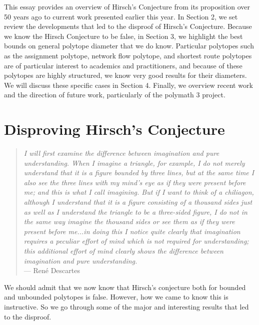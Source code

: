 \documentclass[11pt,a4paper]{article}
\theoremstyle{definition}
\begin{document}
This essay provides an overview of Hirsch's Conjecture from its proposition over 50 years ago to current work presented earlier this year. In Section 2, we set review the developments that led to the disproof of Hirsch's Conjecture. Because we know the Hirsch Conjecture to be false, in Section 3, we highlight the best bounds on general polytope diameter that we do know. Particular polytopes such as the assignment polytope, network flow polytope, and shortest route polytopes are of particular interest to academics and practitioners, and because of these polytopes are highly structured, we know very good results for their diameters. We will discuss these specific cases in Section 4. Finally, we overview recent work and the direction of future work, particularly of the polymath 3 project.

\section{Disproving Hirsch's Conjecture}
\begin{quotation}
\emph{I will first examine the difference between imagination and pure understanding. When I imagine a triangle, for example, I do not merely understand that it is a figure bounded by three lines, but at the same time I also see the three lines with my mind's eye as if they were present before me; and this is what I call imagining. But if I want to think of a chiliagon, although I understand that it is a figure consisting of a thousand sides just as well as I understand the triangle to be a three-sided figure, I do not in the same way imagine the thousand sides or see them as if they were present before me...in doing this I notice quite clearly that imagination requires a peculiar effort of mind which is not required for understanding; this additional effort of mind clearly shows the difference between imagination and pure understanding.}\\
--- Ren\'{e} Descartes \citep{desc96}
\end{quotation}
We should admit that we now know that Hirsch's conjecture both for bounded and unbounded polytopes is false. However, how we came to know this is instructive. So we go through some of the major and interesting results that led to the disproof.
\end{document}
